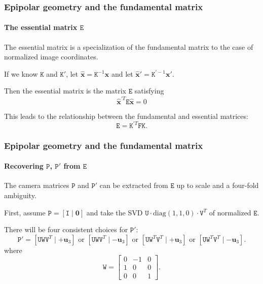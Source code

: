 \documentclass[aspectratio=169]{beamer}
\renewcommand{\vec}[1]{\boldsymbol{#1}}
\newcommand{\mat}[1]{\mathtt{#1}}
\begin{document}
\begin{frame}
\frametitle{Epipolar geometry and the fundamental matrix}
\framesubtitle{The essential matrix $\mat{E}$}

The \alert{essential matrix} is a specialization of the fundamental
matrix to the case of \alert{normalized image coordinates}.

\medskip

If we know $\mat{K}$ and $\mat{K}'$, let
$\hat{\vec{x}}=\mat{K}^{-1}\vec{x}$ and let
$\hat{\vec{x}}'=\mat{K}^{\prime -1}\vec{x}'$.

\medskip

Then the essential matrix is the matrix $\mat{E}$ satisfying
\begin{equation*}
\hat{\vec{x}}^{\prime T}\mat{E}\hat{\vec{x}}=0
\end{equation*}

\medskip

This leads to the relationship between the fundamental and essential
matrices:
\begin{equation*}
\mat{E}=\mat{K}^{\prime T}\mat{F}\mat{K}.
\end{equation*}

\end{frame}

\begin{frame}
\frametitle{Epipolar geometry and the fundamental matrix}
\framesubtitle{Recovering $\mat{P}$, $\mat{P}'$ from $\mat{E}$}

The camera matrices $\mat{P}$ and $\mat{P}'$ can be extracted from
$\mat{E}$ \alert{up to scale and a four-fold ambiguity}.

\medskip

First, assume $\mat{P}=[\mat{I}\mid\vec{0}]$ and take the SVD $\mat{U}
\cdot \text{diag}(1,1,0) \cdot \mat{V}^T$ of normalized $\mat{E}$.

\medskip

There will be four consistent choices for $\mat{P}'$:
\begin{equation*}
\mat{P}'=[\mat{U}\mat{W}\mat{V}^T \mid +\vec{u}_3]
\text{\ or\ }
[\mat{U}\mat{W}\mat{V}^T \mid -\vec{u}_3]
\text{\ or\ }
[\mat{U}\mat{W}^T\mat{V}^T \mid +\vec{u}_3]
\text{\ or\ }
[\mat{U}\mat{W}^T\mat{V}^T \mid -\vec{u}_3].
\end{equation*}
where
\begin{equation*}
\mat{W} = \begin{bmatrix} 0 & -1 & 0 \\ 1 & 0 & 0 \\ 0 & 0 & 1
\end{bmatrix}.
\end{equation*}

\end{frame}
\end{document}
